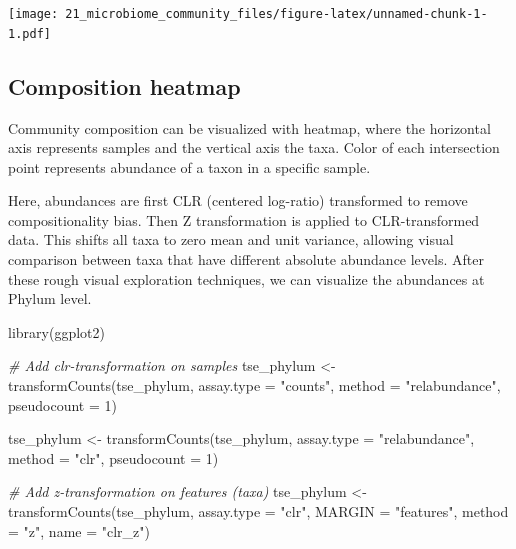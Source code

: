 \documentclass[
]{book}
\newenvironment{Shaded}{\begin{snugshade}}{\end{snugshade}}
\newcommand{\AttributeTok}[1]{\textcolor[rgb]{0.77,0.63,0.00}{#1}}
\newcommand{\CommentTok}[1]{\textcolor[rgb]{0.56,0.35,0.01}{\textit{#1}}}
\newcommand{\DecValTok}[1]{\textcolor[rgb]{0.00,0.00,0.81}{#1}}
\newcommand{\FunctionTok}[1]{\textcolor[rgb]{0.00,0.00,0.00}{#1}}
\newcommand{\NormalTok}[1]{#1}
\newcommand{\OtherTok}[1]{\textcolor[rgb]{0.56,0.35,0.01}{#1}}
\newcommand{\StringTok}[1]{\textcolor[rgb]{0.31,0.60,0.02}{#1}}
\begin{document}
\texttt{[image: 21\_microbiome\_community\_files/figure-latex/unnamed-chunk-1-1.pdf]}

\hypertarget{composition-heatmap}{%
\subsection{Composition heatmap}\label{composition-heatmap}}

Community composition can be visualized with heatmap, where the
horizontal axis represents samples and the vertical axis the
taxa. Color of each intersection point represents abundance of a taxon
in a specific sample.

Here, abundances are first CLR (centered log-ratio) transformed to
remove compositionality bias. Then Z transformation is applied to
CLR-transformed data. This shifts all taxa to zero mean and unit
variance, allowing visual comparison between taxa that have different
absolute abundance levels. After these rough visual exploration
techniques, we can visualize the abundances at Phylum level.

\begin{Shaded}
\begin{Highlighting}[]
\FunctionTok{library}\NormalTok{(ggplot2)}

\CommentTok{\# Add clr{-}transformation on samples}
\NormalTok{tse\_phylum }\OtherTok{\textless{}{-}} \FunctionTok{transformCounts}\NormalTok{(tse\_phylum, }\AttributeTok{assay.type =} \StringTok{"counts"}\NormalTok{,}
                              \AttributeTok{method =} \StringTok{"relabundance"}\NormalTok{, }\AttributeTok{pseudocount =} \DecValTok{1}\NormalTok{)}

\NormalTok{tse\_phylum }\OtherTok{\textless{}{-}} \FunctionTok{transformCounts}\NormalTok{(tse\_phylum, }\AttributeTok{assay.type =} \StringTok{"relabundance"}\NormalTok{,}
                              \AttributeTok{method =} \StringTok{"clr"}\NormalTok{, }\AttributeTok{pseudocount =} \DecValTok{1}\NormalTok{)}

\CommentTok{\# Add z{-}transformation on features (taxa)}
\NormalTok{tse\_phylum }\OtherTok{\textless{}{-}} \FunctionTok{transformCounts}\NormalTok{(tse\_phylum, }\AttributeTok{assay.type =} \StringTok{"clr"}\NormalTok{, }
                              \AttributeTok{MARGIN =} \StringTok{"features"}\NormalTok{,}
                              \AttributeTok{method =} \StringTok{"z"}\NormalTok{, }\AttributeTok{name =} \StringTok{"clr\_z"}\NormalTok{)}
\end{Highlighting}
\end{Shaded}
\end{document}

